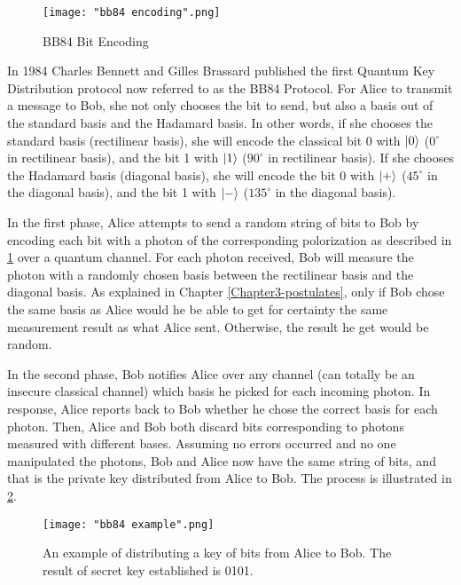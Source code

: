 \begin{figure}[h]
    \centering
    \texttt{[image: "bb84 encoding".png]}
    \caption{BB84 Bit Encoding \protect\footnotemark}
    \label{fig:BB84 bit encoding}
\end{figure}

In 1984 Charles Bennett and Gilles Brassard published the first Quantum Key Distribution protocol \cite{Bennett1984} now referred to as the BB84 Protocol. For Alice to transmit a message to Bob, she not only chooses the bit to send, but also a basis out of the standard basis and the Hadamard basis. In other words, if she chooses the standard basis (rectilinear basis), she will encode the classical bit 0 with $\ket{0}$ ($0^\circ$ in rectilinear basis), and the bit 1 with $\ket{1}$ ($90^\circ$ in rectilinear basis). If she chooses the Hadamard basis (diagonal basis), she will encode the bit 0 with $\ket{+}$ ($45^\circ$ in the diagonal basis), and the bit 1 with $\ket{-}$ ($135^\circ$ in the diagonal basis). 

In the first phase, Alice attempts to send a random string of bits to Bob by encoding each bit with a photon of the corresponding polorization as described in \ref{fig:BB84 bit encoding} over a quantum channel. For each photon received, Bob will measure the photon with a randomly chosen basis between the rectilinear basis and the diagonal basis. As explained in Chapter \ref{Chapter3-postulates}, only if Bob chose the same basis as Alice would he be able to get for certainty the same measurement result as what Alice sent. Otherwise, the result he get would be random.

In the second phase, Bob notifies Alice over any channel (can totally be an insecure classical channel) which basis he picked for each incoming photon. In response, Alice reports back to Bob whether he chose the correct basis for each photon. Then, Alice and Bob both discard bits corresponding to photons measured with different bases. Assuming no errors occurred and no one manipulated the photons, Bob and Alice now have the same string of bits, and that is the private key distributed from Alice to Bob. The process is illustrated in \ref{fig:BB84 bit example}.

\begin{figure}[h]
    \centering
    \texttt{[image: "bb84 example".png]}
    \caption{An example of distributing a key of bits from Alice to Bob. The result of secret key established is 0101.\protect\footnotemark}
    \label{fig:BB84 bit example}
\end{figure}

